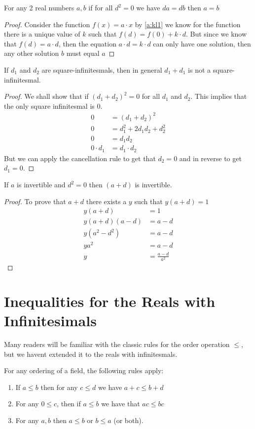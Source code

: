 \begin{theorem}
  For any 2 real numbers $a,b$ if for all $d^2=0$ we have $da=db$ then $a=b$
\end{theorem}
\begin{proof}
  Consider the function $f(x)=a\cdot x$ by \autoref{a:kl1} we know for the function there is a unique value of $k$ such that $f(d)=f(0)+k\cdot d$. But since we know that $f(d)=a\cdot d$, then the equation $a\cdot d = k \cdot d$ can only have one solution, then any other solution $b$ must equal $a$
\end{proof}
\begin{corollary}
  If $d_1$ and $d_2$ are square-infinitesmals, then in general $d_1+d_1$ is not a square-infinitesmal.
\end{corollary}
\begin{proof}
  We shall show that if $(d_1+d_2)^2=0$ for all $d_1$ and $d_2$. This implies that the only square infinitesmal is 0.
  \begin{align*}
    0&=(d_1+d_2)^2\\
    0&=d_1^2+2d_1d_2+d_2^2\\
    0&=d_1d_2\\
    0\cdot d_1&=d_1 \cdot d_2
  \end{align*}
  But we can apply the cancellation rule to get that $d_2=0$ and in reverse to get $d_1=0$. 
\end{proof}
\begin{lemma}[Invertibility of $a+d$]
  If $a$ is invertible and $d^2=0$ then $(a+d)$ is invertible.
\end{lemma}
\begin{proof}
  To prove that $a+d$ there exists a $y$ such that $y(a+d)=1$
  \begin{align*}
    y(a+d)&=1\\
    y(a+d)(a-d)&=a-d\\
    y(a^2-d^2)&=a-d\\
    ya^2&=a-d\\
    y&=\frac{a-d}{a^2}
  \end{align*}
\end{proof}
\section{Inequalities for the Reals with Infinitesimals}
Many readers will be familiar with the classic rules for the order operation $\leq$, but we havent extended it to the reals with infinitesmals. 
\begin{definition}[$\leq$] For any ordering of a field, the following rules apply:
  \begin{enumerate}
    \item If $a \leq b$ then for any $c \leq d$ we have $a+c \leq b+d$
    \item For any $0 \leq c$, then if $a \leq b$ we have that $ac \leq bc$
    \item For any $a,b$ then $a \leq b$ or $b \leq a$ (or both). 
  \end{enumerate}
\end{definition}


